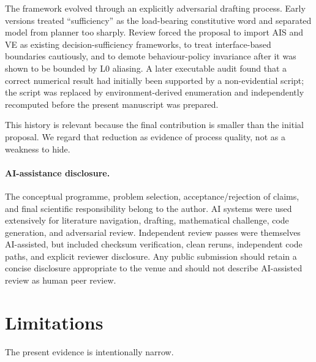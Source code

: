 \documentclass[10pt]{article}
\begin{document}
The framework evolved through an explicitly adversarial drafting process. Early versions treated ``sufficiency'' as the load-bearing constitutive word and separated model from planner too sharply. Review forced the proposal to import AIS and VE as existing decision-sufficiency frameworks, to treat interface-based boundaries cautiously, and to demote behaviour-policy invariance after it was shown to be bounded by L0 aliasing. A later executable audit found that a correct numerical result had initially been supported by a non-evidential script; the script was replaced by environment-derived enumeration and independently recomputed before the present manuscript was prepared.

This history is relevant because the final contribution is smaller than the initial proposal. We regard that reduction as evidence of process quality, not as a weakness to hide.

\paragraph{AI-assistance disclosure.}
The conceptual programme, problem selection, acceptance/rejection of claims, and final scientific responsibility belong to the author. AI systems were used extensively for literature navigation, drafting, mathematical challenge, code generation, and adversarial review. Independent review passes were themselves AI-assisted, but included checksum verification, clean reruns, independent code paths, and explicit reviewer disclosure. Any public submission should retain a concise disclosure appropriate to the venue and should not describe AI-assisted review as human peer review.

\section{Limitations}

The present evidence is intentionally narrow.
\end{document}
